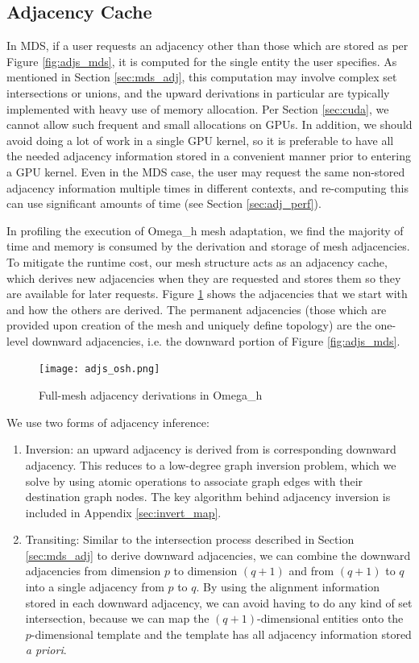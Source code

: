 \subsection{Adjacency Cache}
\label{sec:adj_cache}

In MDS, if a user requests an adjacency other than those
which are stored as per Figure \ref{fig:adjs_mds},
it is computed for the single entity the user specifies.
As mentioned in Section \ref{sec:mds_adj}, this computation
may involve complex set intersections or unions, and the
upward derivations in particular are typically implemented with
heavy use of memory allocation.
Per Section \ref{sec:cuda}, we cannot allow such frequent
and small allocations on GPUs.
In addition, we should avoid doing a lot of work in a single GPU kernel,
so it is preferable to have all the needed adjacency information stored in
a convenient manner prior to entering a GPU kernel.
Even in the MDS case, the user may request the same non-stored
adjacency information multiple times
in different contexts, and re-computing this can use significant
amounts of time (see Section \ref{sec:adj_perf}).

In profiling the execution of Omega\_h mesh adaptation, we find
the majority of time and memory is consumed by the
derivation and storage of mesh adjacencies.
To mitigate the runtime cost, our mesh structure acts as an adjacency cache,
which derives new adjacencies when they are requested and stores
them so they are available for later requests.
Figure \ref{fig:adjs_osh} shows the adjacencies that we start with
and how the others are derived.
The permanent adjacencies (those which are provided upon creation
of the mesh and uniquely define topology) are the one-level downward
adjacencies, i.e. the downward portion of Figure \ref{fig:adjs_mds}.

\begin{figure}
\begin{center}
\texttt{[image: adjs\_osh.png]}
\caption{Full-mesh adjacency derivations in Omega\_h}
\label{fig:adjs_osh}
\end{center}
\end{figure}

We use two forms of adjacency inference:
\begin{enumerate}
\item Inversion: an upward adjacency is derived from is corresponding downward
adjacency. This reduces to a low-degree graph inversion problem, which we
solve by using atomic operations to associate graph edges with their
destination graph nodes.
The key algorithm behind adjacency inversion is included
in Appendix \ref{sec:invert_map}.
\item Transiting: Similar to the intersection process described in Section
\ref{sec:mds_adj} to derive downward adjacencies, we can combine the
downward adjacencies from dimension $p$ to dimension $(q+1)$ and
from $(q+1)$ to $q$ into a single adjacency from $p$ to $q$.
By using the alignment information stored in each downward adjacency,
we can avoid having to do any kind of set intersection, because we
can map the $(q+1)$-dimensional entities onto the $p$-dimensional template
and the template has all adjacency information stored {\it a priori}.
\end{enumerate}


